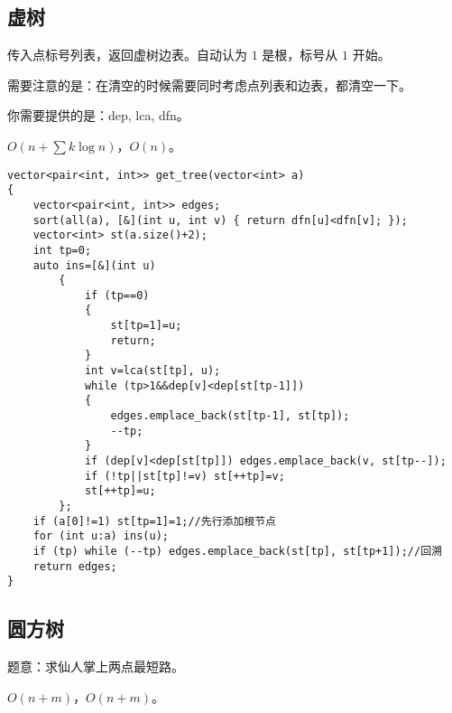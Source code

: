 \documentclass[12pt]{ctexart}
\begin{document}
\subsection{虚树}

传入点标号列表，返回虚树边表。自动认为 $1$ 是根，标号从 $1$ 开始。

需要注意的是：在清空的时候需要同时考虑点列表和边表，都清空一下。

你需要提供的是：dep, lca, dfn。

$O(n+\sum k\log n)$，$O(n)$。

\begin{lstlisting}
vector<pair<int, int>> get_tree(vector<int> a)
{
	vector<pair<int, int>> edges;
	sort(all(a), [&](int u, int v) { return dfn[u]<dfn[v]; });
	vector<int> st(a.size()+2);
	int tp=0;
	auto ins=[&](int u)
		{
			if (tp==0)
			{
				st[tp=1]=u;
				return;
			}
			int v=lca(st[tp], u);
			while (tp>1&&dep[v]<dep[st[tp-1]])
			{
				edges.emplace_back(st[tp-1], st[tp]);
				--tp;
			}
			if (dep[v]<dep[st[tp]]) edges.emplace_back(v, st[tp--]);
			if (!tp||st[tp]!=v) st[++tp]=v;
			st[++tp]=u;
		};
	if (a[0]!=1) st[tp=1]=1;//先行添加根节点
	for (int u:a) ins(u);
	if (tp) while (--tp) edges.emplace_back(st[tp], st[tp+1]);//回溯
	return edges;
}
\end{lstlisting}

\subsection{圆方树}

题意：求仙人掌上两点最短路。

$O(n+m)$，$O(n+m)$。
\end{document}
